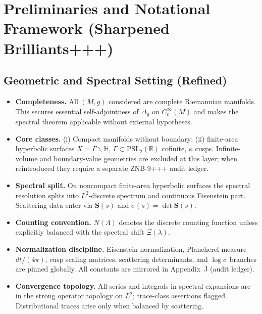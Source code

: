 
\chapter{Preliminaries and Notational Framework (Sharpened Brilliants+++)}
\label{chap:preliminaries-sharp}

\section{Geometric and Spectral Setting (Refined)}
\label{sec:geom-spectral-setting-sharp}

\begin{tcolorbox}[colback=gray!5,colframe=gray!55,
  title=Scope \& Assumptions (ZNB-9+++ Brilliants+++ • enforced)]
\begin{itemize}
  \item \textbf{Completeness.} All $(M,g)$ considered are complete Riemannian manifolds. This secures essential self-adjointness of $\Delta_g$ on $C_c^\infty(M)$ and makes the spectral theorem applicable without external hypotheses.
  \item \textbf{Core classes.} (i) Compact manifolds without boundary; (ii) finite-area hyperbolic surfaces $X=\Gamma\backslash\mathbb H$, $\Gamma\subset\mathrm{PSL}_2(\mathbb R)$ cofinite, $\kappa$ cusps. Infinite-volume and boundary-value geometries are excluded at this layer; when reintroduced they require a separate ZNB-9+++ audit ledger.
  \item \textbf{Spectral split.} On noncompact finite-area hyperbolic surfaces the spectral resolution splits into $L^2$-discrete spectrum and continuous Eisenstein part. Scattering data enter via $\mathbf S(s)$ and $\sigma(s)=\det\mathbf S(s)$.
  \item \textbf{Counting convention.} $N(\Lambda)$ denotes the discrete counting function unless explicitly balanced with the spectral shift $\Xi(\lambda)$.
  \item \textbf{Normalization discipline.} Eisenstein normalization, Plancherel measure $dt/(4\pi)$, cusp scaling matrices, scattering determinants, and $\log\sigma$ branches are pinned globally. All constants are mirrored in Appendix~J (audit ledger).
  \item \textbf{Convergence topology.} All series and integrals in spectral expansions are in the strong operator topology on $L^2$; trace-class assertions flagged. Distributional traces arise only when balanced by scattering.
\end{itemize}
\end{tcolorbox}

